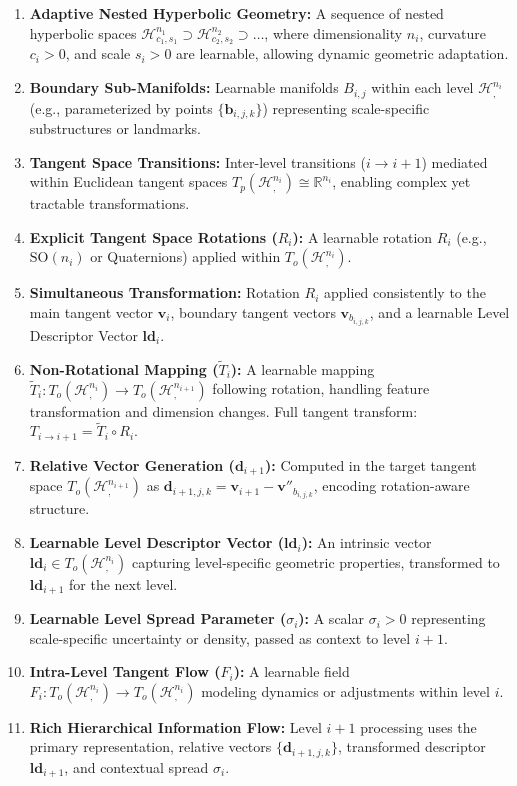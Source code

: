 \documentclass[11pt, twoside]{article} %
\newcommand{\HypSpaceCmd}[3]{\mathcal{H}^{#1}_{#2, #3}} %
\newcommand{\R}{\mathbb{R}} %
\newcommand{\SOcmd}[1]{\text{SO}(#1)} %
\begin{document}
\begin{enumerate}[label=\arabic*), wide, labelindent=0pt]
    \item \textbf{Adaptive Nested Hyperbolic Geometry:} A sequence of nested hyperbolic spaces $\HypSpaceCmd{n_1}{c_1}{s_1} \supset \HypSpaceCmd{n_2}{c_2}{s_2} \supset \dots$, where dimensionality $n_i$, curvature $c_i > 0$, and scale $s_i > 0$ are learnable, allowing dynamic geometric adaptation.
    \item \textbf{Boundary Sub-Manifolds:} Learnable manifolds $B_{i,j}$ within each level $\HypSpaceCmd{n_i}{}{}$ (e.g., parameterized by points $\{\mathbf{b}_{i,j,k}\}$) representing scale-specific substructures or landmarks.
    \item \textbf{Tangent Space Transitions:} Inter-level transitions ($i \rightarrow i+1$) mediated within Euclidean tangent spaces $T_p(\HypSpaceCmd{n_i}{}{}) \cong \R^{n_i}$, enabling complex yet tractable transformations.
    \item \textbf{Explicit Tangent Space Rotations ($R_i$):} A learnable rotation $R_i$ (e.g., $\SOcmd{n_i}$ or Quaternions) applied within $T_o(\HypSpaceCmd{n_i}{}{})$.
    \item \textbf{Simultaneous Transformation:} Rotation $R_i$ applied consistently to the main tangent vector $\mathbf{v}_i$, boundary tangent vectors $\mathbf{v}_{b_{i,j,k}}$, and a learnable Level Descriptor Vector $\mathbf{ld}_i$.
    \item \textbf{Non-Rotational Mapping ($\tilde{T}_i$):} A learnable mapping $\tilde{T}_i: T_o(\HypSpaceCmd{n_i}{}{}) \rightarrow T_o(\HypSpaceCmd{n_{i+1}}{}{})$ following rotation, handling feature transformation and dimension changes. Full tangent transform: $T_{i \rightarrow i+1} = \tilde{T}_i \circ R_i$.
    \item \textbf{Relative Vector Generation ($\mathbf{d}_{i+1}$):} Computed in the target tangent space $T_o(\HypSpaceCmd{n_{i+1}}{}{})$ as $\mathbf{d}_{i+1, j, k} = \mathbf{v}_{i+1} - \mathbf{v}''_{b_{i,j,k}}$, encoding rotation-aware structure.
    \item \textbf{Learnable Level Descriptor Vector ($\mathbf{ld}_i$):} An intrinsic vector $\mathbf{ld}_i \in T_o(\HypSpaceCmd{n_i}{}{})$ capturing level-specific geometric properties, transformed to $\mathbf{ld}_{i+1}$ for the next level.
    \item \textbf{Learnable Level Spread Parameter ($\sigma_i$):} A scalar $\sigma_i > 0$ representing scale-specific uncertainty or density, passed as context to level $i+1$.
    \item \textbf{Intra-Level Tangent Flow ($F_i$):} A learnable field $F_i: T_o(\HypSpaceCmd{n_i}{}{}) \rightarrow T_o(\HypSpaceCmd{n_i}{}{})$ modeling dynamics or adjustments within level $i$.
    \item \textbf{Rich Hierarchical Information Flow:} Level $i+1$ processing uses the primary representation, relative vectors $\{\mathbf{d}_{i+1, j, k}\}$, transformed descriptor $\mathbf{ld}_{i+1}$, and contextual spread $\sigma_i$.
\end{enumerate}
\end{document}

